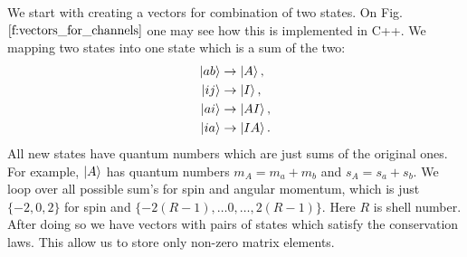 \documentclass[twoside,english]{uiofysmaster}
\theoremstyle{definition}
\begin{document}
We start with creating a vectors for combination of two states. On Fig. $\ref{f:vectors_for_channels}$ one may see how this is implemented in C++. We mapping two states into one state which is a sum of the two:
\begin{align}
\ket{ab} &\rightarrow \ket{A}, \\
\ket{ij} &\rightarrow \ket{I}, \\
\ket{ai} &\rightarrow \ket{AI}, \\
\ket{ia} &\rightarrow \ket{IA}. \\
\end{align}
All new states have quantum numbers which are just sums of the original ones. For example, $\ket{A}$ has quantum numbers $m_A = m_a+m_b$ and  $s_A = s_a+s_b$. We loop over all possible sum's for spin and angular momentum, which is just $\{-2,0,2\}$ for spin and $\{-2(R-1), \dots 0, \dots , 2(R-1)\}$. Here $R$ is shell number. After doing so we have vectors with pairs of states which satisfy the conservation laws. This allow us to store only non-zero matrix elements.\\
\end{document}
